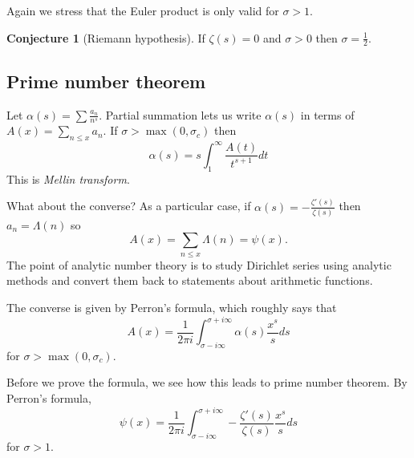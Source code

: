 \documentclass[a4paper]{article}
\theoremstyle{definition}
\newtheorem*{conjecture}{Conjecture}
\begin{document}
Again we stress that the Euler product is only valid for \(\sigma > 1\).

\begin{conjecture}[Riemann hypothesis]
  If \(\zeta(s) = 0\) and \(\sigma > 0\) then \(\sigma = \frac{1}{2}\).
\end{conjecture}

\begin{center}
\end{center}

\subsection{Prime number theorem}

Let \(\alpha(s) = \sum \frac{a_n}{n^s}\). Partial summation lets us write \(\alpha(s)\) in terms of \(A(x) = \sum_{n \leq x} a_n\). If \(\sigma > \max (0, \sigma_c)\) then
\[
  \alpha(s) = s \int_1^\infty \frac{A(t)}{t^{s + 1}} dt
\]
This is \emph{Mellin transform}.

What about the converse? As a particular case, if \(\alpha(s) = -\frac{\zeta'(s)}{\zeta(s)}\) then \(a_n = \Lambda(n)\) so
\[
  A(x) = \sum_{n \leq x} \Lambda(n) = \psi(x).
\]
The point of analytic number theory is to study Dirichlet series using analytic methods and convert them back to statements about arithmetic functions.

The converse is given by Perron's formula, which roughly says that
\[
  A(x) = \frac{1}{2\pi i} \int_{\sigma - i \infty}^{\sigma + i \infty} \alpha(s) \frac{x^s}{s} ds
\]
for \(\sigma > \max (0, \sigma_c)\).

Before we prove the formula, we see how this leads to prime number theorem. By Perron's formula,
\[
  \psi(x) = \frac{1}{2\pi i} \int_{\sigma - i \infty}^{\sigma + i \infty} -\frac{\zeta'(s)}{\zeta(s)} \frac{x^s}{s} ds
\]
for \(\sigma > 1\).
\end{document}
